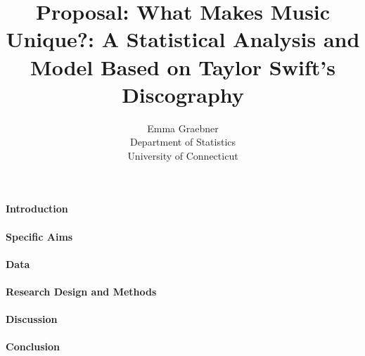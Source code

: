 \documentclass[12pt]{article}
\title{Proposal: What Makes Music Unique?: A Statistical Analysis and Model Based on Taylor Swift's Discography}
\author{Emma Graebner\\
  Department of Statistics\\
  University of Connecticut
}
\begin{document}
\maketitle


\paragraph{Introduction}

\citep{sloan2021taylor}

\paragraph{Specific Aims}


\paragraph{Data}


\paragraph{Research Design and Methods}


\paragraph{Discussion}


\paragraph{Conclusion}




\end{document}
